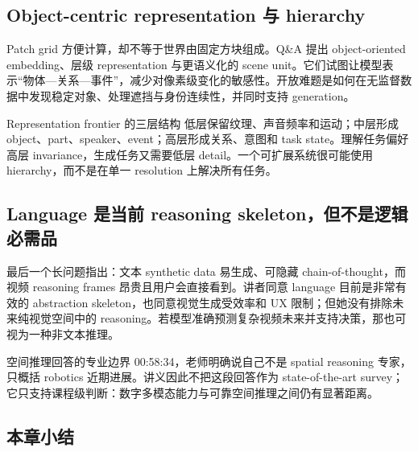 \documentclass[a4paper]{article}
\begin{document}

\subsection{Object-centric representation 与 hierarchy}

Patch grid 方便计算，却不等于世界由固定方块组成。Q\&A 提出 object-oriented embedding、层级 representation 与更语义化的 scene unit。它们试图让模型表示“物体—关系—事件”，减少对像素级变化的敏感性。开放难题是如何在无监督数据中发现稳定对象、处理遮挡与身份连续性，并同时支持 generation。

\begin{knowledgebox}{Representation frontier 的三层结构}
低层保留纹理、声音频率和运动；中层形成 object、part、speaker、event；高层形成关系、意图和 task state。理解任务偏好高层 invariance，生成任务又需要低层 detail。一个可扩展系统很可能使用 hierarchy，而不是在单一 resolution 上解决所有任务。
\end{knowledgebox}

\subsection{Language 是当前 reasoning skeleton，但不是逻辑必需品}

最后一个长问题指出：文本 synthetic data 易生成、可隐藏 chain-of-thought，而视频 reasoning frames 昂贵且用户会直接看到。讲者同意 language 目前是非常有效的 abstraction skeleton，也同意视觉生成受效率和 UX 限制；但她没有排除未来纯视觉空间中的 reasoning。若模型准确预测复杂视频未来并支持决策，那也可视为一种非文本推理。


\begin{warningbox}{空间推理回答的专业边界}
00:58:34，老师明确说自己不是 spatial reasoning 专家，只概括 robotics 近期进展。讲义因此不把这段回答作为 state-of-the-art survey；它只支持课程级判断：数字多模态能力与可靠空间推理之间仍有显著距离。
\end{warningbox}

\subsection{本章小结}
\end{document}
